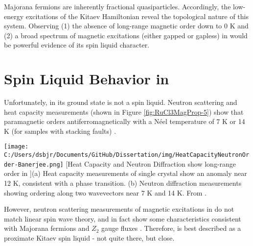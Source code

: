 Majorana fermions are inherently fractional quasiparticles. Accordingly, the low-energy excitations of the Kitaev Hamiltonian reveal the topological nature of this system. Observing (1) the absence of long-range magnetic order down to 0 K and (2) a broad spectrum of magnetic excitations (either gapped or gapless) in \rucl would be powerful evidence of its spin liquid character.

\section{Spin Liquid Behavior in \texorpdfstring{\rucl}{RuCl3}}

Unfortunately, \rucl in its ground state is not a spin liquid. Neutron scattering and heat capacity measurements (shown in Figure \ref{fig:RuCl3MagProp-5}) show that paramagnetic \rucl orders antiferromagnetically with a N\'{e}el temperature of 7 K or 14 K (for samples with stacking faults) \cite{Banerjee2016,Sears2015}.

\begin{centering}
\texttt{[image: C:/Users/dsbjr/Documents/GitHub/Dissertation/img/HeatCapacityNeutronOrder-Banerjee.png]}
  \captionsetup{width=0.75\textwidth}
  [Heat Capacity and Neutron Diffraction show long-range order in \ruclnospace]{(a) Heat capacity measurements of single crystal \rucl show an anomaly near 12 K, consistent with a phase transition. (b) Neutron diffraction measurements showing ordering along two wavevectors near 7 K and 14 K. From \cite{Banerjee2016}.}
  \label{fig:RuCl3MagProp-5}
\end{centering}

However, neutron scattering measurements of magnetic excitations in \rucl do not match linear spin wave theory, and in fact show some characteristics consistent with Majorana fermions and $Z_{2}$ gauge fluxes \cite{Banerjee2017}. Therefore, \rucl is best described as a proximate Kitaev spin liquid - not quite there, but close.

